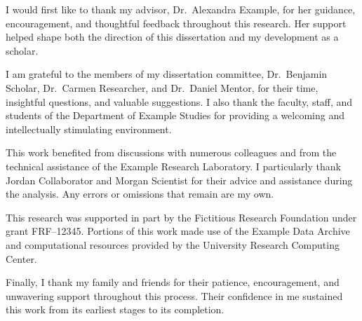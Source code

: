 %
%
% 

I would first like to thank my advisor, Dr.\ Alexandra Example, for her guidance, encouragement, and thoughtful feedback throughout this research. Her support helped shape both the direction of this dissertation and my development as a scholar.

I am grateful to the members of my dissertation committee, Dr.\ Benjamin Scholar, Dr.\ Carmen Researcher, and Dr.\ Daniel Mentor, for their time, insightful questions, and valuable suggestions. I also thank the faculty, staff, and students of the Department of Example Studies for providing a welcoming and intellectually stimulating environment.

This work benefited from discussions with numerous colleagues and from the technical assistance of the Example Research Laboratory. I particularly thank Jordan Collaborator and Morgan Scientist for their advice and assistance during the analysis. Any errors or omissions that remain are my own.

This research was supported in part by the Fictitious Research Foundation under grant FRF--12345. Portions of this work made use of the Example Data Archive and computational resources provided by the University Research Computing Center.

Finally, I thank my family and friends for their patience, encouragement, and
unwavering support throughout this process. Their confidence in me sustained
this work from its earliest stages to its completion.
